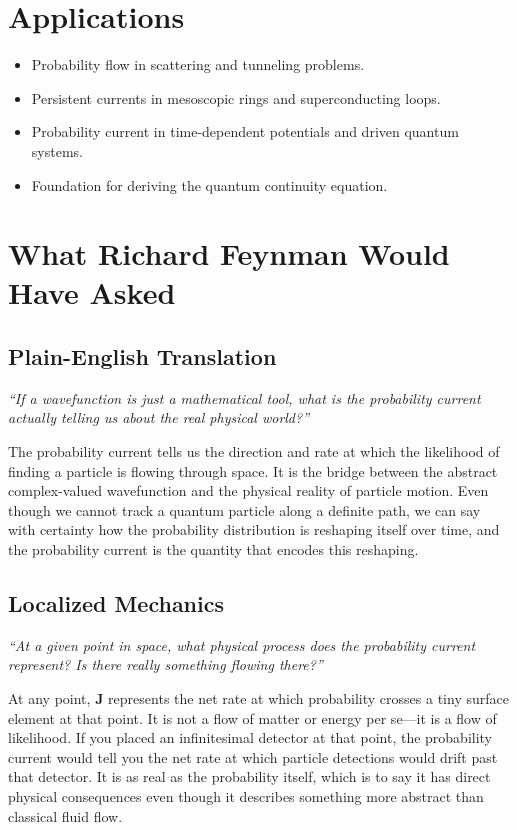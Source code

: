 \section*{Applications}

\begin{itemize}
    \item Probability flow in scattering and tunneling problems.
    \item Persistent currents in mesoscopic rings and superconducting loops.
    \item Probability current in time-dependent potentials and driven quantum systems.
    \item Foundation for deriving the quantum continuity equation.
\end{itemize}
\section*{What Richard Feynman Would Have Asked}

\subsection*{Plain-English Translation}
\textit{``If a wavefunction is just a mathematical tool, what is the probability current actually telling us about the real physical world?''}

The probability current tells us the direction and rate at which the likelihood of finding a particle is flowing through space. It is the bridge between the abstract complex-valued wavefunction and the physical reality of particle motion. Even though we cannot track a quantum particle along a definite path, we can say with certainty how the probability distribution is reshaping itself over time, and the probability current is the quantity that encodes this reshaping.

\subsection*{Localized Mechanics}
\textit{``At a given point in space, what physical process does the probability current represent? Is there really something flowing there?''}

At any point, $\mathbf{J}$ represents the net rate at which probability crosses a tiny surface element at that point. It is not a flow of matter or energy per se---it is a flow of likelihood. If you placed an infinitesimal detector at that point, the probability current would tell you the net rate at which particle detections would drift past that detector. It is as real as the probability itself, which is to say it has direct physical consequences even though it describes something more abstract than classical fluid flow.


